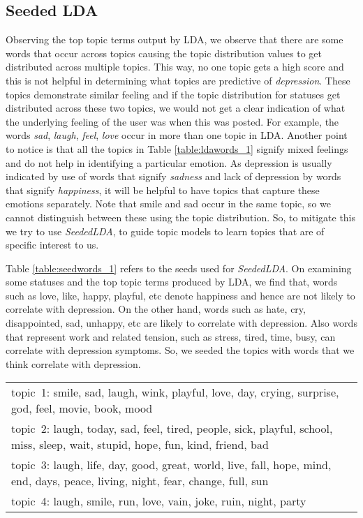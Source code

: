 \subsection{Seeded LDA}
\label{sec:seededlda}

Observing the top topic terms output by LDA, we observe that there are some words that occur across topics causing the topic distribution values to get distributed across multiple topics. This way, no one topic gets a high score and this is not helpful in determining what topics are predictive of \textit{depression}. These topics demonstrate similar feeling and if the topic distribution for statuses get distributed across these two topics, we would not get a clear indication of what the underlying feeling of the user was when this was posted. For example, the words \textit{sad}, \textit{laugh}, \textit{feel}, \textit{love} occur in more than one topic in LDA. Another point to notice is that all the topics in Table \ref{table:ldawords_1} signify mixed feelings and do not help in identifying a particular emotion. As depression is usually indicated by use of words that signify \textit{sadness} and lack of depression by words that signify \textit{happiness}, it will be helpful to have topics that capture these emotions separately. Note that smile and sad occur in the same topic, so we cannot distinguish between these using the topic distribution. So, to mitigate this we try to use \textit{SeededLDA}, to guide topic models to learn topics that are of specific interest to us.

Table \ref{table:seedwords_1} refers to the seeds used for \textit{SeededLDA}. On examining some statuses and the top topic terms produced by LDA, we find that, words such as love, like, happy, playful, etc denote happiness and hence are not likely to correlate with depression. On the other hand, words such as hate, cry, disappointed, sad, unhappy, etc are likely to correlate with depression. Also words that represent work and related tension, such as stress, tired, time, busy, can correlate with depression symptoms. So, we seeded the topics with words that we think correlate with depression.

\begin{table*} [ht!]
	\begin{tabular}{ l }
\hline
{topic~1: smile, sad, laugh, wink, playful, love, day, crying, surprise, god, feel, movie, book, mood}\\
{topic~2: laugh, today, sad, feel, tired, people, sick, playful, school, miss, sleep, wait, stupid, hope, fun, kind, friend, bad}\\
{topic~3: laugh, life, day, good, great, world, live, fall, hope, mind, end, days, peace, living, night, fear, change, full, sun}\\
{topic~4: laugh, smile, run, love, vain, joke, ruin, night, party}\\
\hline
    \end{tabular}
      \caption{\noindent LDA topics. Note that some words repeat across multiple topics}
        \label{table:ldawords_1}
\end{table*}

